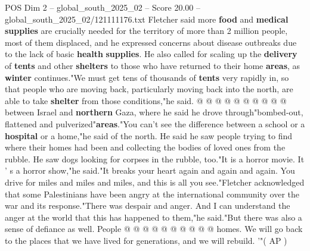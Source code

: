 \begin{textsample}{POS Dim 2 – global\_south\_2025\_02 – Score 20.00 – global\_south\_2025\_02/121111176.txt}
Fletcher said more \textbf{food} and \textbf{medical} \textbf{supplies} are crucially needed for the territory of more than 2 million people, most of them displaced, and he expressed concerns about disease outbreaks due to the lack of basic \textbf{health} \textbf{supplies}.
He also called for scaling up the \textbf{delivery} of \textbf{tents} and other \textbf{shelters} to those who have returned to their home \textbf{areas}, as \textbf{winter} continues."We must get tens of thousands of \textbf{tents} very rapidly in, so that people who are moving back, particularly moving back into the north, are able to take \textbf{shelter} from those conditions,"he said. @ @ @ @ @ @ @ @ @ @ between Israel and \textbf{northern} Gaza, where he said he drove through"bombed-out, flattened and pulverized"\textbf{areas}."You can't see the difference between a school or a \textbf{hospital} or a home,"he said of the north.
He said he saw people trying to find where their homes had been and collecting the bodies of loved ones from the rubble.
He saw dogs looking for corpses in the rubble, too."It is a horror movie.
It ' s a horror show,"he said."It breaks your heart again and again and again.
You drive for miles and miles and miles, and this is all you see."Fletcher acknowledged that some Palestinians have been angry at the international community over the war and its response."There was despair and anger.
And I can understand the anger at the world that this has happened to them,"he said."But there was also a sense of defiance as well.
People @ @ @ @ @ @ @ @ @ @ homes.
We will go back to the places that we have lived for generations, and we will rebuild. '"( AP )

\end{textsample}
